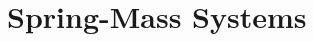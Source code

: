 \documentclass[12pt,compress,aspectratio=169]{beamer}
\begin{document}
%
%
%  
%
%
%
%
%
%



\section{Spring-Mass Systems}
\end{document}
